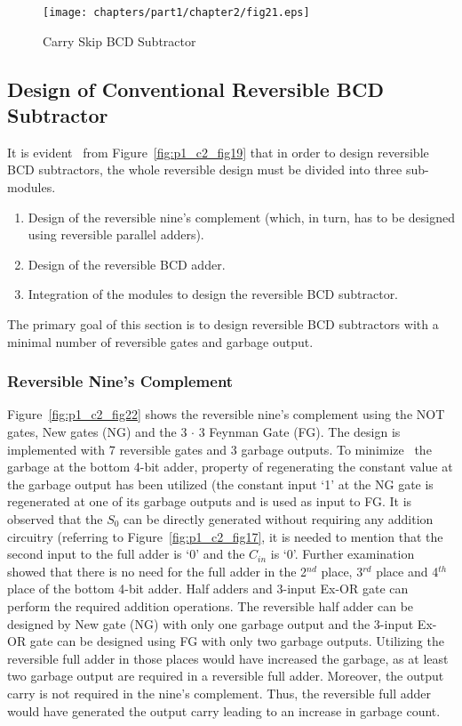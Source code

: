 \begin{figure}[!tbh]
\centering
\texttt{[image: chapters/part1/chapter2/fig21.eps]}
\caption{Carry Skip BCD Subtractor}
\label{fig:p1_c2_fig21}
\end{figure}


\subsection{Design of Conventional Reversible BCD Subtractor}
It is evident~ from Figure~\ref{fig:p1_c2_fig19} that in order to design reversible BCD subtractors, the whole reversible design must be divided into three sub-modules.
\begin{enumerate}
\item Design of the reversible nine's complement (which, in turn, has to be designed using reversible parallel adders).

\item Design of the reversible BCD adder.

\item Integration of the modules to design the reversible BCD subtractor.
\end{enumerate}

The primary goal of this section is to design reversible BCD subtractors with a minimal number of reversible gates and garbage output.

\subsubsection{Reversible Nine's Complement}

Figure~\ref{fig:p1_c2_fig22} shows the reversible nine's complement using the NOT gates, New gates (NG) and the 3 ${\cdot}$ 3 Feynman Gate (FG). The design is implemented with 7 reversible gates and 3 garbage outputs. To minimize~ the garbage at the bottom 4-bit adder, property of regenerating the constant value at the garbage output has been utilized (the constant input `1' at the NG gate is regenerated at one of its garbage outputs and is used as input to FG. It is observed that the $S_0$ can be directly generated without requiring any addition circuitry (referring to Figure~\ref{fig:p1_c2_fig17}, it is needed to mention that the second input to the full adder is `0' and the $C_{in}$ is `0'. Further examination showed that there is no need for the full adder in the 2${}^{nd}$ place, 3${}^{rd}$ place and 4${}^{th}$ place of the bottom 4-bit adder. Half adders and 3-input Ex-OR gate can perform the required addition operations. The reversible half adder can be designed by New gate (NG) with only one garbage output and the 3-input Ex-OR gate can be designed using FG with only two garbage outputs. Utilizing the reversible full adder in those places would have increased the garbage, as at least two garbage output are required in a reversible full adder. Moreover, the output carry is not required in the nine's complement. Thus, the reversible full adder would have generated the output carry leading to an increase in garbage count.

